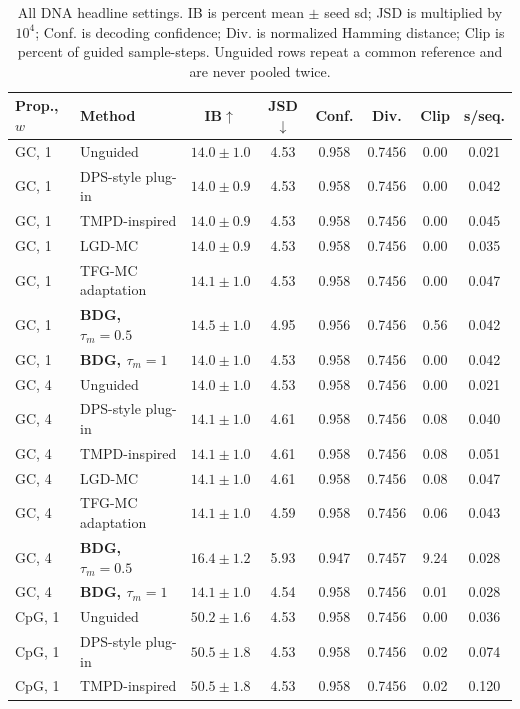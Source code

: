 \documentclass{article}
\begin{document}
\begin{table}[!htbp]
\centering\small
\caption{All DNA headline settings. IB is percent mean $\pm$ seed sd; JSD is multiplied by $10^4$; Conf. is decoding confidence; Div. is normalized Hamming distance; Clip is percent of guided sample-steps. Unguided rows repeat a common reference and are never pooled twice.}
\label{tab:full-m2}
\begin{tabular}{llcccccc}
\toprule
Prop., $w$ & Method & IB$\uparrow$ & JSD$\downarrow$ & Conf. & Div. & Clip & s/seq.\\
\midrule
GC, 1 & Unguided & $14.0\pm1.0$ & 4.53 & 0.958 & 0.7456 & 0.00 & 0.021\\
GC, 1 & DPS-style plug-in & $14.0\pm0.9$ & 4.53 & 0.958 & 0.7456 & 0.00 & 0.042\\
GC, 1 & TMPD-inspired & $14.0\pm0.9$ & 4.53 & 0.958 & 0.7456 & 0.00 & 0.045\\
GC, 1 & LGD-MC & $14.0\pm0.9$ & 4.53 & 0.958 & 0.7456 & 0.00 & 0.035\\
GC, 1 & TFG-MC adaptation & $14.1\pm1.0$ & 4.53 & 0.958 & 0.7456 & 0.00 & 0.047\\
GC, 1 & \textbf{BDG, $\tau_m=0.5$} & $14.5\pm1.0$ & 4.95 & 0.956 & 0.7456 & 0.56 & 0.042\\
GC, 1 & \textbf{BDG, $\tau_m=1$} & $14.0\pm1.0$ & 4.53 & 0.958 & 0.7456 & 0.00 & 0.042\\
\midrule
GC, 4 & Unguided & $14.0\pm1.0$ & 4.53 & 0.958 & 0.7456 & 0.00 & 0.021\\
GC, 4 & DPS-style plug-in & $14.1\pm1.0$ & 4.61 & 0.958 & 0.7456 & 0.08 & 0.040\\
GC, 4 & TMPD-inspired & $14.1\pm1.0$ & 4.61 & 0.958 & 0.7456 & 0.08 & 0.051\\
GC, 4 & LGD-MC & $14.1\pm1.0$ & 4.61 & 0.958 & 0.7456 & 0.08 & 0.047\\
GC, 4 & TFG-MC adaptation & $14.1\pm1.0$ & 4.59 & 0.958 & 0.7456 & 0.06 & 0.043\\
GC, 4 & \textbf{BDG, $\tau_m=0.5$} & $16.4\pm1.2$ & 5.93 & 0.947 & 0.7457 & 9.24 & 0.028\\
GC, 4 & \textbf{BDG, $\tau_m=1$} & $14.1\pm1.0$ & 4.54 & 0.958 & 0.7456 & 0.01 & 0.028\\
\midrule
CpG, 1 & Unguided & $50.2\pm1.6$ & 4.53 & 0.958 & 0.7456 & 0.00 & 0.036\\
CpG, 1 & DPS-style plug-in & $50.5\pm1.8$ & 4.53 & 0.958 & 0.7456 & 0.02 & 0.074\\
CpG, 1 & TMPD-inspired & $50.5\pm1.8$ & 4.53 & 0.958 & 0.7456 & 0.02 & 0.120\\

\end{tabular}
\end{table}
\end{document}

